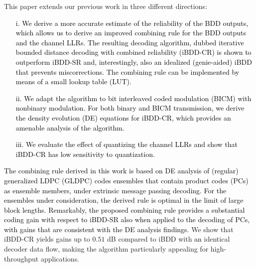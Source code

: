 \documentclass[journal]{IEEEtran}
\newcommand{\SH}{\textcolor{black}}
\newcommand{\GL}{\textcolor{black}}
\begin{document}
This paper extends our previous work \cite{sheikhTCOM19} in three different directions: 
\GL{\begin{itemize}
\item[i.] We \GL{derive a more accurate estimate of} the reliability of the BDD outputs, which allows us to derive \GL{an improved} combining \GL{rule for} the BDD outputs and the channel LLRs. The resulting decoding algorithm, dubbed iterative bounded distance decoding with combined reliability (iBDD-CR) is shown to outperform iBDD-SR and, interestingly, also an idealized (genie-aided) iBDD that prevents miscorrections. The \GL{combining rule} can be implemented by means of a small lookup table (LUT).
\item[ii.] We ad\GL{a}pt the algorithm to bit interleaved coded modulation (BICM) with \SH{nonbinary} modulation. For both binary and BICM transmission, we derive the density evolution (DE) equations for iBDD-CR, which provides an amenable analysis of the algorithm. 
\item[iii.] We \SH{evaluate} the effect of quantizing the channel \GL{LLRs} and show that iBDD-CR has low sensitivity to quantization.
\end{itemize}}
\GL{The combining rule derived in this work is based on DE analysis of (regular) generalized LDPC (GLDPC) codes ensembles that contain product codes \SH{(PCs)} as ensemble members, under extrinsic message passing decoding. For the ensembles under consideration, the derived rule is optimal in the limit of large block lengths. Remarkably, the proposed combining rule provides a substantial coding gain with respect to iBDD-SR also when applied to the decoding of \SH{PCs}, with gains that are consistent with the DE analysis findings.}
We show that 
iBDD-CR yields gains up to $0.51$ dB compared to iBDD with \GL{an} identical decoder data flow, 
making the algorithm particularly appealing for high-throughput applications.
\end{document}
